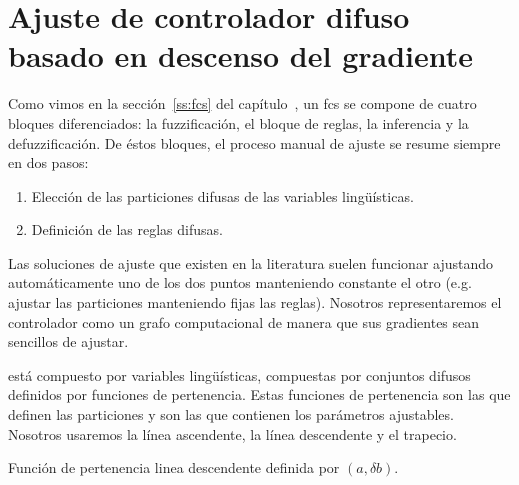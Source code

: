 \chapter{Ajuste de controlador difuso basado en descenso del gradiente}
\label{ch:fuzzy-controller-adjustment}


Como vimos en la sección~\ref{ss:fcs} del capítulo~, un \ac{fcs} se compone de cuatro bloques diferenciados: la fuzzificación, el bloque de reglas, la inferencia y la defuzzificación. De éstos bloques, el proceso manual de ajuste se resume siempre en dos pasos:

\begin{enumerate}
	\item Elección de las particiones difusas de las variables lingüísticas.
	\item Definición de las reglas difusas.
\end{enumerate}

Las soluciones de ajuste que existen en la literatura suelen funcionar ajustando automáticamente uno de los dos puntos manteniendo constante el otro (e.g. ajustar las particiones manteniendo fijas las reglas). Nosotros representaremos el controlador como un grafo computacional de manera que sus gradientes sean sencillos de ajustar.

 está compuesto por variables lingüísticas, compuestas por conjuntos difusos definidos por funciones de pertenencia. Estas funciones de pertenencia son las que definen las particiones y son las que contienen los parámetros ajustables. Nosotros usaremos la línea ascendente, la línea descendente y el trapecio.

\begin{marginfigure}
	\caption{Función de pertenencia linea descendente definida por $(a, \delta b)$.}
	\label{fig:line-asc}
\end{marginfigure}

